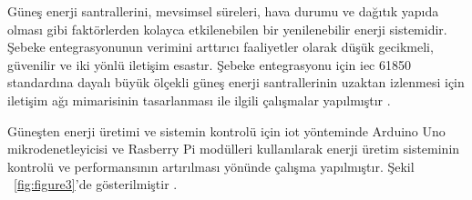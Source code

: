 Güneş enerji santrallerini, mevsimsel süreleri, hava durumu ve dağıtık yapıda olması gibi faktörlerden kolayca etkilenebilen bir yenilenebilir enerji sistemidir. Şebeke entegrasyonunun verimini arttırıcı faaliyetler olarak düşük gecikmeli, güvenilir ve iki yönlü iletişim esastır. Şebeke entegrasyonu için \gls{iec} 61850 standardına dayalı büyük ölçekli güneş enerji santrallerinin uzaktan izlenmesi için iletişim ağı mimarisinin tasarlanması ile ilgili çalışmalar yapılmıştır \cite{mackiewicz2006overview}.

Güneşten enerji üretimi ve sistemin kontrolü için \gls{iot} yönteminde Arduino Uno mikrodenetleyicisi ve Rasberry Pi modülleri kullanılarak enerji üretim sisteminin kontrolü ve performansının artırılması yönünde çalışma yapılmıştır. Şekil ~\ref{fig:figure3}'de gösterilmiştir \cite{deshmukh2018smart}.

